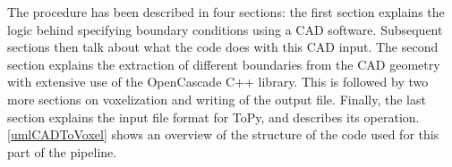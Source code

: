 The procedure has been described in four sections: the first section explains the logic behind specifying boundary conditions using a CAD software. Subsequent sections then talk about what the code does with this CAD input. The second section explains the extraction of different boundaries from the CAD geometry with extensive use of the OpenCascade C++ library. This is followed by two more sections on voxelization and writing of the output file. Finally, the last section explains the input file format for ToPy, and describes its operation. \ref{umlCADToVoxel} shows an overview of the structure of the code used for this part of the pipeline.







%


%

